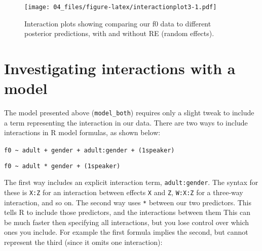 \documentclass[
]{book}
\newenvironment{Shaded}{\begin{snugshade}}{\end{snugshade}}
\newcommand{\AttributeTok}[1]{\textcolor[rgb]{0.77,0.63,0.00}{#1}}
\newcommand{\DecValTok}[1]{\textcolor[rgb]{0.00,0.00,0.81}{#1}}
\newcommand{\FloatTok}[1]{\textcolor[rgb]{0.00,0.00,0.81}{#1}}
\newcommand{\FunctionTok}[1]{\textcolor[rgb]{0.00,0.00,0.00}{#1}}
\newcommand{\NormalTok}[1]{#1}
\newcommand{\SpecialCharTok}[1]{\textcolor[rgb]{0.00,0.00,0.00}{#1}}
\newcommand{\StringTok}[1]{\textcolor[rgb]{0.31,0.60,0.02}{#1}}
\begin{document}
\begin{Shaded}
\end{Shaded}

\begin{figure}
\centering
\texttt{[image: 04\_files/figure-latex/interactionplot3-1.pdf]}
\caption{\label{fig:interactionplot3}Interaction plots showing comparing our f0 data to different posterior predictions, with and without RE (random effects).}
\end{figure}

\hypertarget{investigating-interactions-with-a-model}{%
\section{Investigating interactions with a model}\label{investigating-interactions-with-a-model}}

The model presented above (\texttt{model\_both}) requires only a slight tweak to include a term representing the interaction in our data. There are two ways to include interactions in R model formulas, as shown below:

\texttt{f0\ \textasciitilde{}\ adult\ +\ gender\ +\ adult:gender\ +\ (1\textbar{}speaker)}
~

\texttt{f0\ \textasciitilde{}\ adult\ *\ gender\ +\ (1\textbar{}speaker)}

The first way includes an explicit interaction term, \texttt{adult:gender}. The syntax for these is \texttt{X:Z} for an interaction between effects \texttt{X} and \texttt{Z}, \texttt{W:X:Z} for a three-way interaction, and so on. The second way uses \texttt{*} between our two predictors. This tells R to include those predictors, and the interactions between them This can be much faster then specifying all interactions, but you lose control over which ones you include. For example the first formula implies the second, but cannot represent the third (since it omits one interaction):
\end{document}
